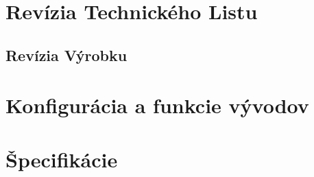 \documentclass[a4paper, 10pt, twoside]{article}
\begin{document}
{
\section{Revízia Technického Listu}
}
\restoregeometry
\newpage
{
\subsection{Revízia Výrobku}
\begin{landscape}
	
\end{landscape}
}
\newpage
{
\section{Konfigurácia a funkcie vývodov}
}
\newpage
{
\section{Špecifikácie}
}
\end{document}
